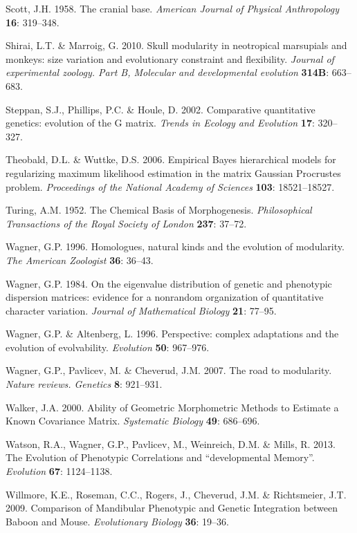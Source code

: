 \documentclass[12pt,]{article}
\begin{document}
Scott, J.H. 1958. The cranial base. \emph{American Journal of Physical
Anthropology} \textbf{16}: 319--348.

Shirai, L.T. \& Marroig, G. 2010. Skull modularity in neotropical
marsupials and monkeys: size variation and evolutionary constraint and
flexibility. \emph{Journal of experimental zoology. Part B, Molecular
and developmental evolution} \textbf{314B}: 663--683.

Steppan, S.J., Phillips, P.C. \& Houle, D. 2002. Comparative
quantitative genetics: evolution of the G matrix. \emph{Trends in
Ecology and Evolution} \textbf{17}: 320--327.

Theobald, D.L. \& Wuttke, D.S. 2006. Empirical Bayes hierarchical models
for regularizing maximum likelihood estimation in the matrix Gaussian
Procrustes problem. \emph{Proceedings of the National Academy of
Sciences} \textbf{103}: 18521--18527.

Turing, A.M. 1952. The Chemical Basis of Morphogenesis.
\emph{Philosophical Transactions of the Royal Society of London}
\textbf{237}: 37--72.

Wagner, G.P. 1996. Homologues, natural kinds and the evolution of
modularity. \emph{The American Zoologist} \textbf{36}: 36--43.

Wagner, G.P. 1984. On the eigenvalue distribution of genetic and
phenotypic dispersion matrices: evidence for a nonrandom organization of
quantitative character variation. \emph{Journal of Mathematical Biology}
\textbf{21}: 77--95.

Wagner, G.P. \& Altenberg, L. 1996. Perspective: complex adaptations and
the evolution of evolvability. \emph{Evolution} \textbf{50}: 967--976.

Wagner, G.P., Pavlicev, M. \& Cheverud, J.M. 2007. The road to
modularity. \emph{Nature reviews. Genetics} \textbf{8}: 921--931.

Walker, J.A. 2000. Ability of Geometric Morphometric Methods to Estimate
a Known Covariance Matrix. \emph{Systematic Biology} \textbf{49}:
686--696.

Watson, R.A., Wagner, G.P., Pavlicev, M., Weinreich, D.M. \& Mills, R.
2013. The Evolution of Phenotypic Correlations and ``developmental
Memory''. \emph{Evolution} \textbf{67}: 1124--1138.

Willmore, K.E., Roseman, C.C., Rogers, J., Cheverud, J.M. \&
Richtsmeier, J.T. 2009. Comparison of Mandibular Phenotypic and Genetic
Integration between Baboon and Mouse. \emph{Evolutionary Biology}
\textbf{36}: 19--36.
\end{document}
